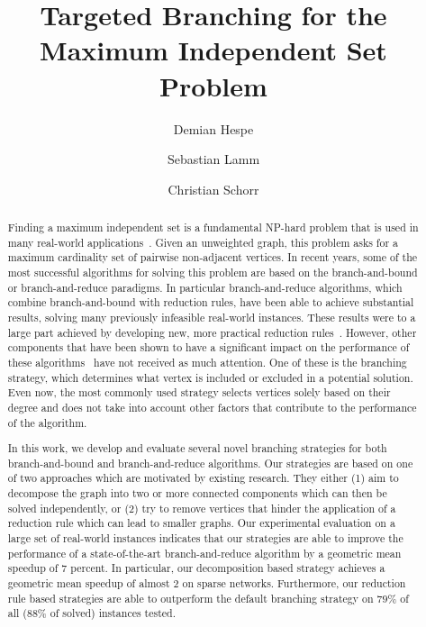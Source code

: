 \documentclass[a4paper,UKenglish,cleveref, autoref, thm-restate]{lipics-v2021}
\title{Targeted Branching for the Maximum Independent Set Problem} %
\author{Demian Hespe}{Karlsruhe Institute of Technology, Institute for
  Theoretical Informatics, Germany}{hespe@kit.edu}{https://orcid.org/0000-0001-6232-2951}{}
\author{Sebastian Lamm}{Karlsruhe Institute of Technology, Institute for
  Theoretical Informatics, Germany}{lamm@kit.edu}{}{\todo{Add funding}}
\author{Christian Schorr}{Karlsruhe Institute of Technology, Institute for
  Theoretical Informatics, Germany}{christian.schorr@student.kit.edu}{}{}
\begin{document}
\maketitle

\begin{abstract}
  Finding a maximum independent set is a fundamental NP-hard problem that is used in many real-world applications~\cite{BIO1,BIO2,RP,NW,CG}.
Given an unweighted graph, this problem asks for a maximum cardinality set of pairwise non-adjacent vertices.
In recent years, some of the most successful algorithms for solving this problem are based on the branch-and-bound or branch-and-reduce paradigms.
In particular branch-and-reduce algorithms, which combine branch-and-bound with reduction rules, have been able to achieve substantial results, solving many previously infeasible real-world instances.
These results were to a large part achieved by developing new, more practical reduction rules~\cite{alsahafy2020computing,ChangKern,dahlum2016accelerating,hespe2019scalable}.
However, other components that have been shown to have a significant impact on the performance of these algorithms~\cite{AkibaIwata} have not received as much attention.
One of these is the branching strategy, which determines what vertex is included or excluded in a potential solution.
Even now, the most commonly used strategy selects vertices solely based on their degree and does not take into account other factors that contribute to the performance of the algorithm.

In this work, we develop and evaluate several novel branching strategies for both branch-and-bound and branch-and-reduce algorithms.
Our strategies are based on one of two approaches which are motivated by existing research. 
They either (1) aim to decompose the graph into two or more connected components which can then be solved independently, or (2) try to remove vertices that hinder the application of a reduction rule which can lead to smaller graphs.
Our experimental evaluation on a large set of real-world instances indicates
that our strategies are able to improve the performance of a state-of-the-art
branch-and-reduce algorithm by a geometric mean speedup of $7$ percent. In particular, our
decomposition based strategy achieves a geometric mean speedup of almost 2 on sparse networks.
Furthermore, our reduction rule based strategies are able to outperform the
default branching strategy on $79\%$ of all
($88\%$ of solved)
instances tested.

\end{abstract}
\end{document}
